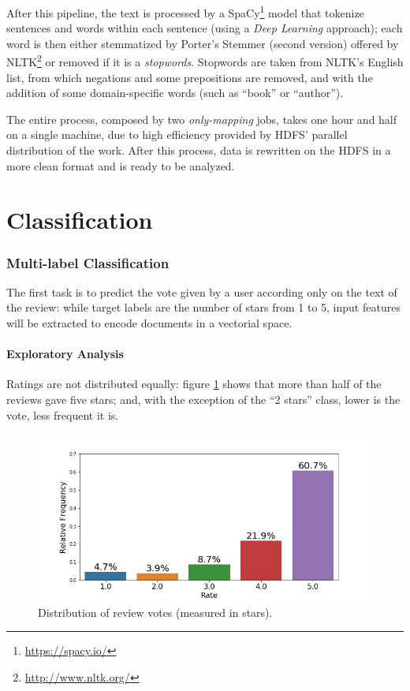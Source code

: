 \documentclass[fleqn,10pt]{SelfArx}
\begin{document}
After this pipeline, the text is processed by a SpaCy\footnote{\url{https://spacy.io/}} model that tokenize sentences and words within each sentence (using a \textit{Deep Learning} approach); each word is then either stemmatized by Porter's Stemmer (second version) offered by NLTK\footnote{\url{http://www.nltk.org/}} or removed if it is a \textit{stopwords}.
Stopwords are taken from NLTK's English list, from which negations and some prepositions are removed, and with the addition of some domain-specific words (such as ``book'' or ``author''). \newline

The entire process, composed by two \textit{only-mapping} jobs, takes one hour and half on a single machine, due to high efficiency provided by HDFS' parallel distribution of the work.
After this process, data is rewritten on the HDFS in a more clean format and is ready to be analyzed.

\newpage
\part{Classification}

\section{Multi-label Classification}
The first task is to predict the vote given by a user according only on the text of the review: while target labels are the number of stars from 1 to 5, input features will be extracted to encode documents in a vectorial space.

\subsection{Exploratory Analysis}
Ratings are not distributed equally: figure \ref{fig:rate_dist} shows that more than half of the reviews gave five stars; and, with the exception of the ``2 stars'' class, lower is the vote, less frequent it is.
\begin{figure}[!h]
    \includegraphics[width=\linewidth]{rate_dist.png}
    \caption{Distribution of review votes (measured in stars).}
    \label{fig:rate_dist}
\end{figure}
\end{document}
